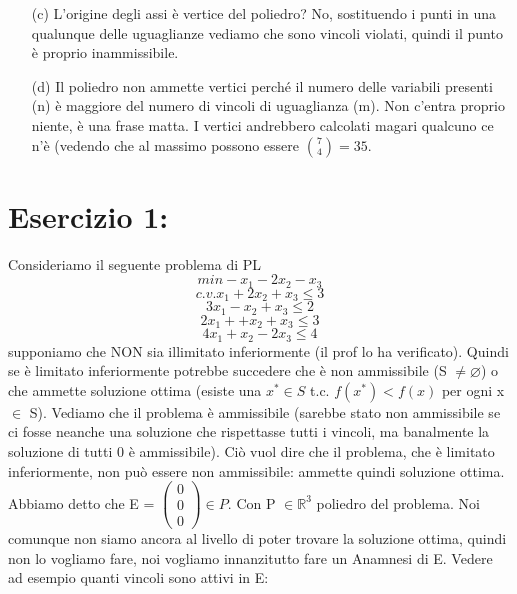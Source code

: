 \begin{itemize}
    
    \item[(c)] L'origine degli assi è vertice del poliedro? No, sostituendo i punti in una qualunque delle uguaglianze vediamo che sono vincoli violati, quindi il punto è proprio inammissibile.
    
    
    \item[(d)] Il poliedro non ammette vertici perché il numero delle variabili presenti (n) è maggiore del numero di vincoli di uguaglianza (m). Non c'entra proprio niente, è una frase matta. I vertici andrebbero calcolati magari qualcuno ce n'è (vedendo che al massimo possono essere $\binom{7}{4} = 35$.
\end{itemize}



\section{Esercizio 1:} Consideriamo il seguente problema di PL
\begin{equation*}
    min -x_1 - 2x_2 - x_3
\end{equation*}
\begin{equation*}
    c.v. x_1 + 2x_2 + x_3 \leq 3
\end{equation*}
\begin{equation*}
    3x_1 - x_2 + x_3 \leq 2
\end{equation*}
\begin{equation*}
    2x_1 ++ x_2 + x_3 \leq 3
\end{equation*}
\begin{equation*}
    4x_1 + x_2 - 2x_3 \leq 4
\end{equation*}
supponiamo che NON sia illimitato inferiormente (il prof lo ha verificato). Quindi se è limitato inferiormente potrebbe succedere che è non ammissibile (S $\neq \varnothing$) o che ammette soluzione ottima (esiste una $x^* \in S $ t.c. $f(x^*) < f(x)$ per ogni x $\in$ S). Vediamo che il problema è ammissibile (sarebbe stato non ammissibile se ci fosse neanche una soluzione che rispettasse tutti i vincoli, ma banalmente la soluzione di tutti 0 è ammissibile). Ciò vuol dire che il problema, che è limitato inferiormente, non può essere non ammissibile: ammette quindi soluzione ottima. Abbiamo detto che E = $\begin{pmatrix}
    0\\
    0\\
    0
\end{pmatrix} \in P$. Con P $\in \mathbb{R}^3$ poliedro del problema. Noi comunque non siamo ancora al livello di poter trovare la soluzione ottima, quindi non lo vogliamo fare, noi vogliamo innanzitutto fare un Anamnesi di E. Vedere ad esempio quanti vincoli sono attivi in E:
